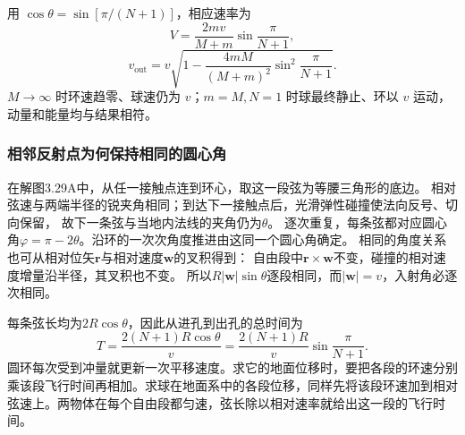 \documentclass[UTF8,fontset=fandol,a4paper,11pt]{ctexart}
\newcommand{\vect}[1]{\bm{#1}}
\begin{document}
用 $\cos\theta=\sin[\pi/(N+1)]$，相应速率为
\[
\boxed{V=\frac{2mv}{M+m}\sin\frac\pi{N+1}},
\]
\[
\boxed{v_{\mathrm{out}}=
v\sqrt{1-\frac{4mM}{(M+m)^2}\sin^2\frac\pi{N+1}}}.
\]
$M\to\infty$ 时环速趋零、球速仍为 $v$；$m=M,N=1$ 时球最终静止、环以 $v$ 运动，动量和能量均与结果相符。
\subsubsection*{相邻反射点为何保持相同的圆心角}
在解图3.29A中，从任一接触点连到环心，取这一段弦为等腰三角形的底边。
相对弦速与两端半径的锐夹角相同；到达下一接触点后，光滑弹性碰撞使法向反号、切向保留，
故下一条弦与当地内法线的夹角仍为$\theta$。
逐次重复，每条弦都对应圆心角$\varphi=\pi-2\theta$。沿环的一次次角度推进由这同一个圆心角确定。
相同的角度关系也可从相对位矢$\vect r$与相对速度$\vect w$的叉积得到：
自由段中$\vect r\times\vect w$不变，碰撞的相对速度增量沿半径，其叉积也不变。
所以$R|\vect w|\sin\theta$逐段相同，而$|\vect w|=v$，入射角必逐次相同。

每条弦长均为$2R\cos\theta$，因此从进孔到出孔的总时间为
\[
T=\frac{2(N+1)R\cos\theta}{v}
=\frac{2(N+1)R}{v}\sin\frac\pi{N+1}.
\]
圆环每次受到冲量就更新一次平移速度。求它的地面位移时，要把各段的环速分别乘该段飞行时间再相加。求球在地面系中的各段位移，同样先将该段环速加到相对弦速上。两物体在每个自由段都匀速，弦长除以相对速率就给出这一段的飞行时间。
\end{document}
